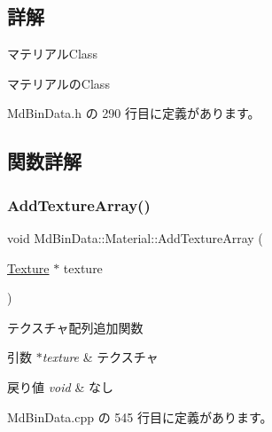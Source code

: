 \subsection{詳解}
マテリアル\+Class 

マテリアルの\+Class 

 Md\+Bin\+Data.\+h の 290 行目に定義があります。



\subsection{関数詳解}
\mbox{\label{class_md_bin_data_1_1_material_a8d6a7d5c0f7f11d84a155846c467a580}} 
\subsubsection{\texorpdfstring{Add\+Texture\+Array()}{AddTextureArray()}}
{\footnotesize\ttfamily void Md\+Bin\+Data\+::\+Material\+::\+Add\+Texture\+Array (\begin{DoxyParamCaption}\item[{\mbox{\hyperlink{class_md_bin_data_1_1_material_1_1_texture}{Texture}} $\ast$}]{texture }\end{DoxyParamCaption})}



テクスチャ配列追加関数 


\begin{DoxyParams}{引数}
{\em $\ast$texture} & テクスチャ \\
\hline
\end{DoxyParams}

\begin{DoxyRetVals}{戻り値}
{\em void} & なし \\
\hline
\end{DoxyRetVals}


 Md\+Bin\+Data.\+cpp の 545 行目に定義があります。

\mbox{\label{class_md_bin_data_1_1_material_a5de4c3bff10499fb4fb861b7a13b6180}} 

